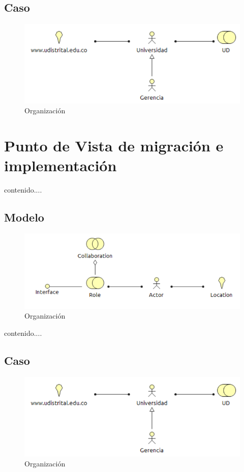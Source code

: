 \subsection{Caso}
\begin{figure}[th!]
	\centering
	\includegraphics[width=0.8\linewidth]{arquitectura_diseno/imgs/C_Organizacion}
	\caption{Organización}
\end{figure}
\newpage
\section{Punto de Vista de migración e implementación}
contenido....
\subsection{Modelo}
\begin{figure}[th!]
	\centering
	\includegraphics[width=0.8\linewidth]{arquitectura_diseno/imgs/M_Organizacion}
	\caption{Organización}
\end{figure}
\newpage
contenido....
\subsection{Caso}
\begin{figure}[th!]
	\centering
	\includegraphics[width=0.8\linewidth]{arquitectura_diseno/imgs/C_Organizacion}
	\caption{Organización}
\end{figure}